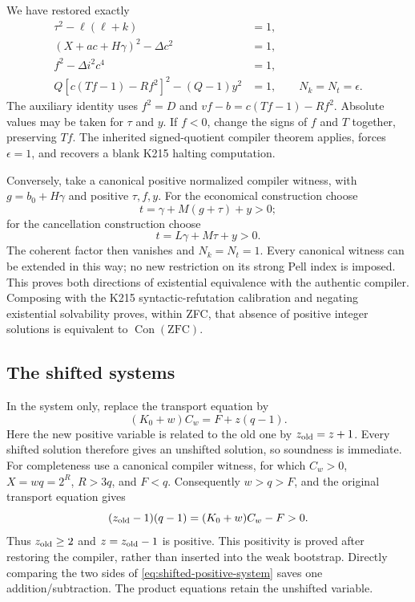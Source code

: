 We have restored exactly
\begin{align*}
 \tau^2-\ell(\ell+k)&=1,\\
 (X+ac+H\gamma)^2-\Delta c^2&=1,\\
 f^2-\Delta i^2c^4&=1,\\
 Q[c(Tf-1)-Rf^2]^2-(Q-1)y^2&=1,
 \qquad N_k=N_t=\epsilon.
\end{align*}
The auxiliary identity uses $f^2=D$ and
$vf-b=c(Tf-1)-Rf^2$.  Absolute values may be taken for $\tau$ and $y$.
If $f<0$, change the signs of $f$ and $T$ together, preserving $Tf$.
The inherited signed-quotient compiler theorem applies, forces
$\epsilon=1$, and recovers a blank K215 halting computation.

Conversely, take a canonical positive normalized compiler witness, with
$g=b_0+H\gamma$ and positive $\tau,f,y$.
For the economical construction choose
\[
 t=\gamma+M(g+\tau)+y>0;
\]
for the cancellation construction choose
\[
 t=L\gamma+M\tau+y>0.
\]
The coherent factor then vanishes and $N_k=N_t=1$.
Every canonical witness can be extended in this way; no new restriction
on its strong Pell index is imposed.
This proves both directions of existential equivalence with the authentic
compiler.  Composing with the K215 syntactic-refutation calibration and
negating existential solvability proves, within ZFC, that absence of
positive integer solutions is equivalent to $\operatorname{Con}(\mathrm{ZFC})$.

\subsection{The shifted systems}

In the system only, replace the transport equation by
\begin{equation}
 (K_0+w)C_w=F+z(q-1).
 \label{eq:shifted-positive-system}
\end{equation}
Here the new positive variable is related to the old one by
$z_{\rm old}=z+1$.  Every shifted solution therefore gives an unshifted
solution, so soundness is immediate.  For completeness use a canonical
compiler witness, for which $C_w>0$, $X=wq=2^R$, $R>3q$, and $F<q$.
Consequently $w>q>F$, and the original transport equation gives
\[
 (z_{\rm old}-1)(q-1)=(K_0+w)C_w-F>0.
\]
Thus $z_{\rm old}\ge2$ and $z=z_{\rm old}-1$ is positive.
This positivity is proved after restoring the compiler, rather than
inserted into the weak bootstrap.  Directly comparing the two sides of
\eqref{eq:shifted-positive-system} saves one addition/subtraction.
The product equations retain the unshifted variable.

